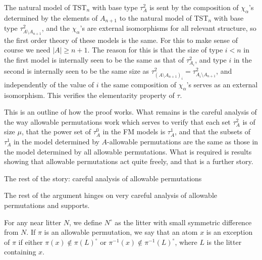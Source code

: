 \documentclass{slides}
\begin{document}
\begin{slide}

The natural model of TST$_n$ with base type $\tau^2_A$ is sent by the composition of $\chi_\alpha$'s determined by the elements of $A_{n+1}$
to the natural model of TST$_n$ with base type $\tau^2_{A \setminus A_{n+1}}$, and the $\chi_\alpha$'s are external isomorphisms for all relevant structure, so the first order theory of these models is the same.  For this to make sense of course we need $|A| \geq n+1$.
The reason for this is that the size of type $i<n$ in the first model is internally seen to be the same as that of $\tau^2_{A_i}$, and type $i$ in the  second is internally seen to be the same size
as  $\tau^2_{(A \setminus A_{n+1})_i} = \tau^2_{A_i \setminus A_{n+1}}$, and independently of the value of $i$ the same composition of $\chi_\alpha$'s serves as an external isomorphism.
This verifies the elementarity property of $\tau$.

\end{slide}

\begin{slide}

This is an outline of how the proof works.  What remains is the careful analysis of the way allowable permutations work which serves to verify that
each set $\tau^2_A$ is of size $\mu$, that the power set of $\tau^0_A$ in the FM models is $\tau^1_A$,  and that the subsets of $\tau^1_A$ in the model determined by $A$-allowable permutations are the same as those in the model
determined by all allowable permutations.  What is required is results showing that allowable permutations act quite freely, and that is a further story.

\end{slide}

\begin{slide}

{\Large The rest of the story:  careful analysis of allowable permutations}

The rest of the argument hinges on very careful analysis of allowable permutations and supports.

For any near litter $N$, we define $N^\circ$ as the litter with small symmetric difference from $N$.  If $\pi$ is an allowable permutation, we say that an atom $x$ is
an exception of $\pi$ if either $\pi(x) \not\in \pi(L)^{\circ}$ or $\pi^{-1}(x) \not\in \pi^{-1}(L)^\circ$, where $L$ is the litter containing $x$.

\end{slide}
\end{document}
